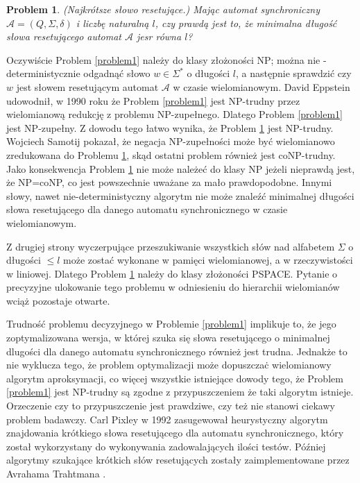 \documentclass[12pt,a4paper]{article}
\newtheorem{pro}{Problem}[section]
\begin{document}
\begin{pro} 
\label{problem2}
(Najkr\'otsze s{\l}owo resetuj\k{a}ce.) Maj\k{a}c automat synchroniczny  $\mathscr{A}=(Q, \Sigma, \delta)$ i liczb\k{e} naturaln\k{a} $l$, czy prawd\k{a} jest to, \.ze minimalna  d{\l}ugo\'s\'c s{\l}owa resetuj\k{a}cego automat $\mathscr{A}$ jesr r\'owna $l$?
\end{pro}

Oczywi\'scie Problem \ref{problem1} nale\.zy do klasy z{\l}o\.zono\'sci NP; mo\.zna nie -deterministycznie odgadn\k{a}\'c s{\l}owo $w\in\Sigma^{*}$ o d{\l}ugo\'sci $l$, a nast\k{e}pnie sprawdzi\'c czy $w$ jest s{\l}owem resetuj\k{a}cym automat $\mathscr{A}$ w czasie wielomianowym. David Eppstein udowodni{\l}, w 1990 roku \.ze Problem \ref{problem1} jest NP-trudny przez wielomianow\k{a} redukcj\k{e} z problemu NP-zupe{\l}nego. Dlatego Problem \ref{problem1} jest NP-zupe{\l}ny. Z dowodu tego {\l}atwo wynika, \.ze Problem \ref{problem2} jest NP-trudny. Wojciech Samotij \cite{1} pokaza{\l}, \.ze negacja NP-zupe{\l}no\'sci mo\.ze by\'c wielomianowo zredukowana do Problemu \ref{problem2}, sk\k{a}d ostatni problem r\'ownie\.z jest coNP-trudny. Jako konsekwencja Problem \ref{problem2} nie mo\.ze nale\.ze\'c do klasy NP je\.zeli nieprawd\k{a} jest, \.ze NP=coNP, co jest powszechnie uwa\.zane za ma{\l}o prawdopodobne. Innymi s{\l}owy, nawet nie-deterministyczny algorytm nie mo\.ze znale\'z\'c minimalnej d{\l}ugo\'sci s{\l}owa resetuj\k{a}cego dla danego automatu synchronicznego w czasie wielomianowym.

Z drugiej strony wyczerpuj\k{a}ce przeszukiwanie wszystkich s{\l}\'ow nad alfabetem $\Sigma$ o d{\l}ugo\'sci $\leq l$ mo\.ze zosta\'c wykonane w pami\k{e}ci wielomianowej, a w rzeczywisto\'sci w liniowej. Dlatego Problem \ref{problem2} nale\.zy do klasy z{\l}o\.zono\'sci PSPACE. Pytanie o precyzyjne ulokowanie tego problemu w odniesieniu do hierarchii wielomian\'ow wci\k{a}\.z pozostaje otwarte. 

Trudno\'s\'c problemu decyzyjnego w Problemie \ref{problem1} implikuje to, \.ze jego zoptymalizowana wersja, w kt\'orej szuka si\k{e} s{\l}owa resetuj\k{a}cego o minimalnej d{l}ugo\'sci dla danego automatu synchronicznego r\'ownie\.z jest trudna. Jednak\.ze to nie wyklucza tego, \.ze problem optymalizacji mo\.ze dopuszcza\.c wielomianowy algorytm aproksymacji, co wi\k{e}cej wszystkie istniej\k{a}ce dowody tego, \.ze Problem \ref{problem1} jest NP-trudny s\k{a} zgodne z  przypuszczeniem \.ze taki algorytm istnieje. Orzeczenie czy to przypuszczenie jest prawdziwe, czy te\.z nie stanowi ciekawy problem badawczy. Carl Pixley \cite{2} w 1992 zasugewowa{\l} heurystyczny algorytm znajdowania kr\'otkiego s{\l}owa resetuj\k{a}cego dla automatu synchronicznego, kt\'ory zosta{\l} wykorzystany do wykonywania zadowalaj\k{a}cych ilo\'sci test\'ow. P\'o\'zniej algorytmy szukaj\k{a}ce kr\'otkich s{\l}\'ow resetuj\k{a}cych zosta{\l}y zaimplementowane przez Avrahama Trahtmana \cite{3}.
\end{document}
